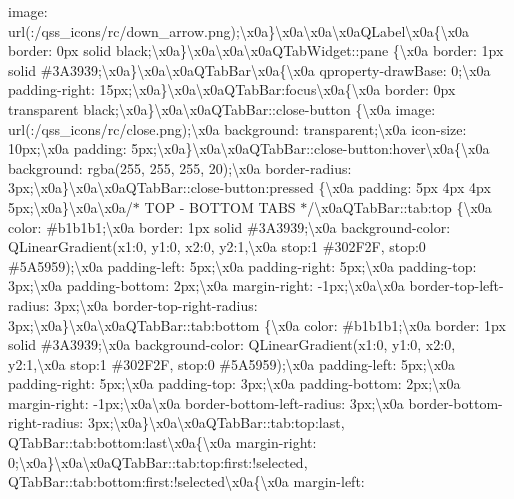 image\+: url(\+:/qss\+\_\+icons/rc/down\+\_\+arrow.\+png);\textbackslash{}x0a\}\textbackslash{}x0a\textbackslash{}x0a\textbackslash{}x0a\+Q\+Label\textbackslash{}x0a\{\textbackslash{}x0a border\+: 0px solid black;\textbackslash{}x0a\}\textbackslash{}x0a\textbackslash{}x0a\textbackslash{}x0a\+Q\+Tab\+Widget\+::pane \{\textbackslash{}x0a border\+: 1px solid \#3\+A3939;\textbackslash{}x0a\}\textbackslash{}x0a\textbackslash{}x0a\+Q\+Tab\+Bar\textbackslash{}x0a\{\textbackslash{}x0a qproperty-\/draw\+Base\+: 0;\textbackslash{}x0a padding-\/right\+: 15px;\textbackslash{}x0a\}\textbackslash{}x0a\textbackslash{}x0a\+Q\+Tab\+Bar\+:focus\textbackslash{}x0a\{\textbackslash{}x0a border\+: 0px transparent black;\textbackslash{}x0a\}\textbackslash{}x0a\textbackslash{}x0a\+Q\+Tab\+Bar\+::close-\/button \{\textbackslash{}x0a image\+: url(\+:/qss\+\_\+icons/rc/close.\+png);\textbackslash{}x0a background\+: transparent;\textbackslash{}x0a icon-\/size\+: 10px;\textbackslash{}x0a padding\+: 5px;\textbackslash{}x0a\}\textbackslash{}x0a\textbackslash{}x0a\+Q\+Tab\+Bar\+::close-\/button\+:hover\textbackslash{}x0a\{\textbackslash{}x0a background\+: rgba(255, 255, 255, 20);\textbackslash{}x0a border-\/radius\+: 3px;\textbackslash{}x0a\}\textbackslash{}x0a\textbackslash{}x0a\+Q\+Tab\+Bar\+::close-\/button\+:pressed \{\textbackslash{}x0a padding\+: 5px 4px 4px 5px;\textbackslash{}x0a\}\textbackslash{}x0a\textbackslash{}x0a/$\ast$ T\+O\+P -\/ B\+O\+T\+T\+O\+M T\+A\+B\+S $\ast$/\textbackslash{}x0a\+Q\+Tab\+Bar\+::tab\+:top \{\textbackslash{}x0a color\+: \#b1b1b1;\textbackslash{}x0a border\+: 1px solid \#3\+A3939;\textbackslash{}x0a background-\/color\+: Q\+Linear\+Gradient(x1\+:0, y1\+:0, x2\+:0, y2\+:1,\textbackslash{}x0a stop\+:1 \#302\+F2\+F, stop\+:0 \#5\+A5959);\textbackslash{}x0a padding-\/left\+: 5px;\textbackslash{}x0a padding-\/right\+: 5px;\textbackslash{}x0a padding-\/top\+: 3px;\textbackslash{}x0a padding-\/bottom\+: 2px;\textbackslash{}x0a margin-\/right\+: -\/1px;\textbackslash{}x0a\textbackslash{}x0a border-\/top-\/left-\/radius\+: 3px;\textbackslash{}x0a border-\/top-\/right-\/radius\+: 3px;\textbackslash{}x0a\}\textbackslash{}x0a\textbackslash{}x0a\+Q\+Tab\+Bar\+::tab\+:bottom \{\textbackslash{}x0a color\+: \#b1b1b1;\textbackslash{}x0a border\+: 1px solid \#3\+A3939;\textbackslash{}x0a background-\/color\+: Q\+Linear\+Gradient(x1\+:0, y1\+:0, x2\+:0, y2\+:1,\textbackslash{}x0a stop\+:1 \#302\+F2\+F, stop\+:0 \#5\+A5959);\textbackslash{}x0a padding-\/left\+: 5px;\textbackslash{}x0a padding-\/right\+: 5px;\textbackslash{}x0a padding-\/top\+: 3px;\textbackslash{}x0a padding-\/bottom\+: 2px;\textbackslash{}x0a margin-\/right\+: -\/1px;\textbackslash{}x0a\textbackslash{}x0a border-\/bottom-\/left-\/radius\+: 3px;\textbackslash{}x0a border-\/bottom-\/right-\/radius\+: 3px;\textbackslash{}x0a\}\textbackslash{}x0a\textbackslash{}x0a\+Q\+Tab\+Bar\+::tab\+:top\+:last, Q\+Tab\+Bar\+::tab\+:bottom\+:last\textbackslash{}x0a\{\textbackslash{}x0a margin-\/right\+: 0;\textbackslash{}x0a\}\textbackslash{}x0a\textbackslash{}x0a\+Q\+Tab\+Bar\+::tab\+:top\+:first\+:!selected, Q\+Tab\+Bar\+::tab\+:bottom\+:first\+:!selected\textbackslash{}x0a\{\textbackslash{}x0a margin-\/left\+: 